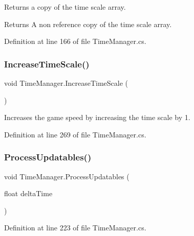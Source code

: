 Returns a copy of the time scale array. 

\begin{DoxyReturn}{Returns}
A non reference copy of the time scale array. 
\end{DoxyReturn}


Definition at line 166 of file Time\+Manager.\+cs.

\mbox{\label{class_time_manager_ade3342429174a1ddcf2557a03d340211}} 
\subsubsection{\texorpdfstring{Increase\+Time\+Scale()}{IncreaseTimeScale()}}
{\footnotesize\ttfamily void Time\+Manager.\+Increase\+Time\+Scale (\begin{DoxyParamCaption}{ }\end{DoxyParamCaption})}



Increases the game speed by increasing the time scale by 1. 



Definition at line 269 of file Time\+Manager.\+cs.

\mbox{\label{class_time_manager_abc8d4800c8e592ff21eb128f7729e7ec}} 
\subsubsection{\texorpdfstring{Process\+Updatables()}{ProcessUpdatables()}}
{\footnotesize\ttfamily void Time\+Manager.\+Process\+Updatables (\begin{DoxyParamCaption}\item[{float}]{delta\+Time }\end{DoxyParamCaption})}



Definition at line 223 of file Time\+Manager.\+cs.

\mbox{\label{class_time_manager_add5fdf0eb0e02fcdeaf8f8b7f201093b}} 
